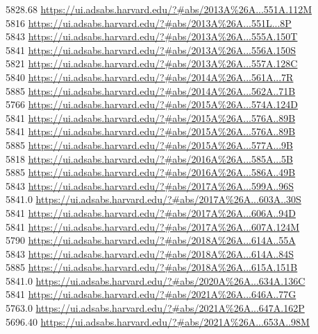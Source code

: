 5828.68 \url{https://ui.adsabs.harvard.edu/?#abs/2013A%26A...551A.112M}\\
5816 \url{https://ui.adsabs.harvard.edu/?#abs/2013A%26A...551L...8P}\\
5843 \url{https://ui.adsabs.harvard.edu/?#abs/2013A%26A...555A.150T}\\
5841 \url{https://ui.adsabs.harvard.edu/?#abs/2013A%26A...556A.150S}\\
5821 \url{https://ui.adsabs.harvard.edu/?#abs/2013A%26A...557A.128C}\\
5840 \url{https://ui.adsabs.harvard.edu/?#abs/2014A%26A...561A...7R}\\
5885 \url{https://ui.adsabs.harvard.edu/?#abs/2014A%26A...562A..71B}\\
5766 \url{https://ui.adsabs.harvard.edu/?#abs/2015A%26A...574A.124D}\\
5841 \url{https://ui.adsabs.harvard.edu/?#abs/2015A%26A...576A..89B}\\
5841 \url{https://ui.adsabs.harvard.edu/?#abs/2015A%26A...576A..89B}\\
5885 \url{https://ui.adsabs.harvard.edu/?#abs/2015A%26A...577A...9B}\\
5818 \url{https://ui.adsabs.harvard.edu/?#abs/2016A%26A...585A...5B}\\
5885 \url{https://ui.adsabs.harvard.edu/?#abs/2016A%26A...586A..49B}\\
5843 \url{https://ui.adsabs.harvard.edu/?#abs/2017A%26A...599A..96S}\\
5841.0 \url{https://ui.adsabs.harvard.edu/?#abs/2017A%26A...603A..30S}\\
5841 \url{https://ui.adsabs.harvard.edu/?#abs/2017A%26A...606A..94D}\\
5841 \url{https://ui.adsabs.harvard.edu/?#abs/2017A%26A...607A.124M}\\
5790 \url{https://ui.adsabs.harvard.edu/?#abs/2018A%26A...614A..55A}\\
5843 \url{https://ui.adsabs.harvard.edu/?#abs/2018A%26A...614A..84S}\\
5885 \url{https://ui.adsabs.harvard.edu/?#abs/2018A%26A...615A.151B}\\
5841.0 \url{https://ui.adsabs.harvard.edu/?#abs/2020A%26A...634A.136C}\\
5841 \url{https://ui.adsabs.harvard.edu/?#abs/2021A%26A...646A..77G}\\
5763.0	\url{https://ui.adsabs.harvard.edu/?#abs/2021A%26A...647A.162P}\\
5696.40 \url{https://ui.adsabs.harvard.edu/?#abs/2021A%26A...653A..98M}\\
